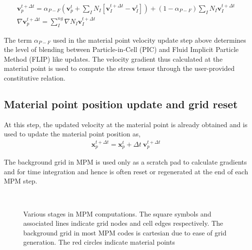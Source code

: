 \begin{align}
\mathbf{v}_p^{t+\Delta t}=\alpha_{P-F}\left(\mathbf{v}_p^t+\sum_I N_I \left[{\mathbf{v}}_I^{t+\Delta t}-\mathbf{v}_I^t\right]\right)+(1-\alpha_{P-F}) \sum_I N_I {\mathbf{v}}_I^{t+\Delta t}\\
\nabla \mathbf{v}_p^{t+\Delta t}=\sum_I^{ng} \nabla N_I \mathbf{v}_I^{t+\Delta t}
\end{align}

The term $\alpha_{P-F}$ used in the material point velocity update step above determines the level of blending between Particle-in-Cell (PIC) and Fluid Implicit Particle Method (FLIP) like updates.
The velocity gradient thus calculated at the material point is used to compute the stress tensor through the user-provided constitutive relation. 

\subsection{Material point position update and grid reset}
At this step, the updated velocity at the material point is already obtained and is used to update the material point position as,
\begin{align}
\mathbf{x}_{p}^{t+\Delta t}=\mathbf{x}_{p}^{t} +\Delta t \: \mathbf{v}_p^{t+\Delta t}
\end{align}

The background grid in MPM is used only as a scratch pad to calculate gradients and for time integration and hence is often reset or regenerated at the end of each MPM step.


\begin{figure}[h]
\\
\caption{Various stages in MPM computations. The square symbols and associated lines indicate grid nodes and cell edges respectively. The background grid in most MPM codes is cartesian due to ease of grid generation. The red circles indicate material points}
\label{Fig:MPM_Steps}
\end{figure}